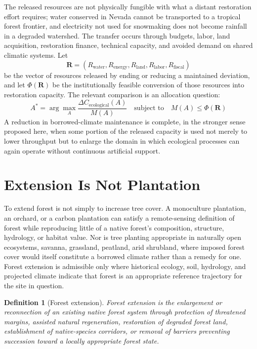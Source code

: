 \documentclass[11pt]{article}
\newtheorem{definition}{Definition}[section]
\begin{document}
The released resources are not physically fungible with what a distant restoration effort requires; water conserved in Nevada cannot be transported to a tropical forest frontier, and electricity not used for snowmaking does not become rainfall in a degraded watershed. The transfer occurs through budgets, labor, land acquisition, restoration finance, technical capacity, and avoided demand on shared climatic systems. Let
\[
\mathbf{R} = (R_{\text{water}}, R_{\text{energy}}, R_{\text{land}}, R_{\text{labor}}, R_{\text{fiscal}})
\]
be the vector of resources released by ending or reducing a maintained deviation, and let $\Phi(\mathbf{R})$ be the institutionally feasible conversion of those resources into restoration capacity. The relevant comparison is an allocation question:
\[
A^{*} = \arg\max_{A} \frac{\Delta C_{\text{ecological}}(A)}{M(A)} \quad \text{subject to} \quad M(A) \leq \Phi(\mathbf{R})
\]
A reduction in borrowed-climate maintenance is complete, in the stronger sense proposed here, when some portion of the released capacity is used not merely to lower throughput but to enlarge the domain in which ecological processes can again operate without continuous artificial support.

\section{Extension Is Not Plantation}

To extend forest is not simply to increase tree cover. A monoculture plantation, an orchard, or a carbon plantation can satisfy a remote-sensing definition of forest while reproducing little of a native forest's composition, structure, hydrology, or habitat value. Nor is tree planting appropriate in naturally open ecosystems, savanna, grassland, peatland, arid shrubland, where imposed forest cover would itself constitute a borrowed climate rather than a remedy for one. Forest extension is admissible only where historical ecology, soil, hydrology, and projected climate indicate that forest is an appropriate reference trajectory for the site in question.

\begin{definition}[Forest extension]
Forest extension is the enlargement or reconnection of an existing native forest system through protection of threatened margins, assisted natural regeneration, restoration of degraded forest land, establishment of native-species corridors, or removal of barriers preventing succession toward a locally appropriate forest state.
\end{definition}
\end{document}
